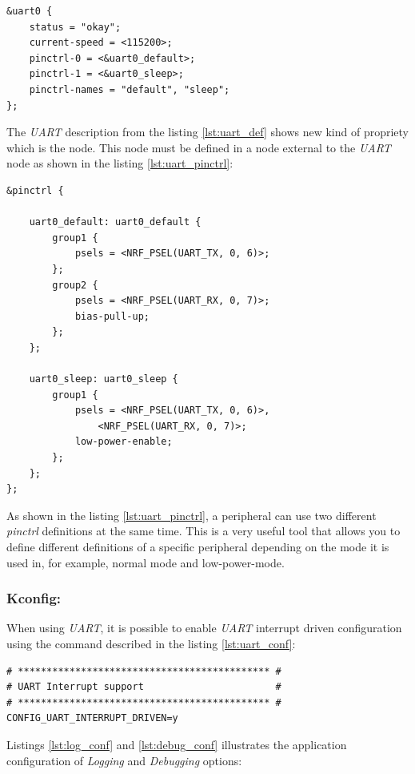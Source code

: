 \documentclass[report.tex]{subfiles}
\begin{document}
\begin{lstlisting}[style=C,label={lst:uart_def},caption={\textit{DT} \textit{UART} Description}]
&uart0 {
	status = "okay";
	current-speed = <115200>;
	pinctrl-0 = <&uart0_default>;
	pinctrl-1 = <&uart0_sleep>;
	pinctrl-names = "default", "sleep";
};
\end{lstlisting}

The \textit{UART} description from the listing \ref{lst:uart_def} shows new kind of propriety which is the  node. This node must be defined in a node external to the \textit{UART} node as shown in the listing \ref{lst:uart_pinctrl}:

\begin{lstlisting}[style=C,label={lst:uart_pinctrl},caption={\textit{DT UART} Pinctrl Description}]
&pinctrl {

	uart0_default: uart0_default {
		group1 {
			psels = <NRF_PSEL(UART_TX, 0, 6)>;
		};
		group2 {
			psels = <NRF_PSEL(UART_RX, 0, 7)>;
			bias-pull-up;
		};
	};

	uart0_sleep: uart0_sleep {
		group1 {
			psels = <NRF_PSEL(UART_TX, 0, 6)>,
				<NRF_PSEL(UART_RX, 0, 7)>;
			low-power-enable;
		};
	};
};
\end{lstlisting}

As shown in the listing \ref{lst:uart_pinctrl}, a peripheral can use two different \textit{pinctrl} definitions at the same time. This is a very useful tool that allows you to define different definitions of a specific peripheral depending on the mode it is used in, for example, normal mode and low-power-mode.

\subsubsection{Kconfig:}

When using \textit{UART}, it is possible to enable \textit{UART} interrupt driven configuration using the command described in the listing \ref{lst:uart_conf}:

\begin{lstlisting}[style=console,label={lst:uart_conf},caption={Application \textit{UART} Configuration}]
# ******************************************** #
# UART Interrupt support                       #
# ******************************************** #
CONFIG_UART_INTERRUPT_DRIVEN=y
\end{lstlisting}

Listings \ref{lst:log_conf} and \ref{lst:debug_conf} illustrates the application configuration of \textit{Logging} and \textit{Debugging} options:
\end{document}
